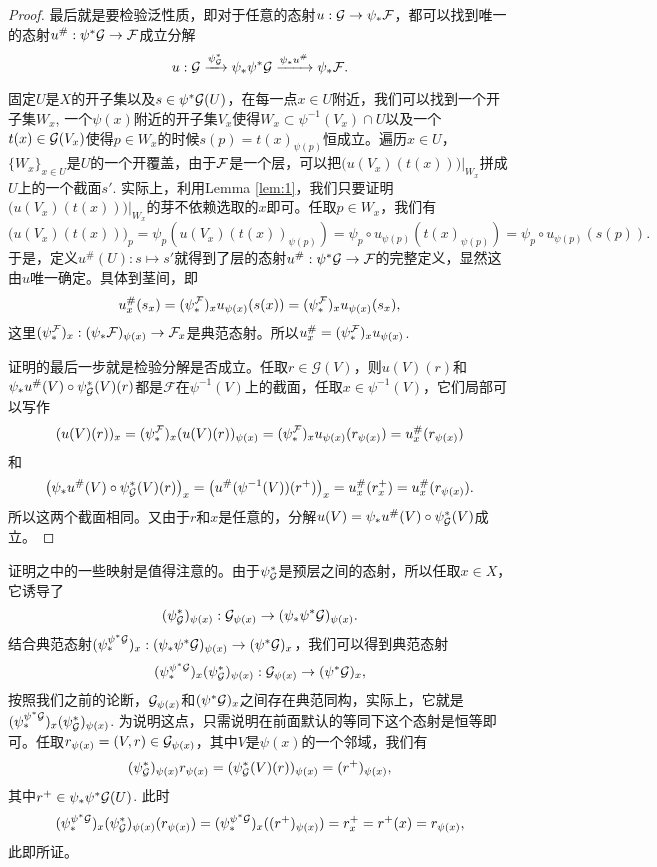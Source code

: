 \begin{proof}
	最后就是要检验泛性质，即对于任意的态射$u:\mathcal{G} \to \psi_*\mathcal{F}$，都可以找到唯一的态射$u^\#:\psi^*\mathcal{G} \to \mathcal{F}$成立分解
	\[
		u:\mathcal{G}\xrightarrow{\psi^*_{\mathcal{G}}} \psi_*\psi^*\mathcal{G} \xrightarrow{\psi_*u^\#} \psi_*\mathcal{F}.
	\]

	固定$U$是$X$的开子集以及$s\in \psi^*\mathcal{G}(U)$，在每一点$x\in U$附近，我们可以找到一个开子集$W_x$, 一个$\psi(x)$附近的开子集$V_x$使得$W_x\subset \psi^{-1}(V_x)\cap U$以及一个$t(x)\in \mathcal{G}(V_x)$使得$p\in W_x$的时候$s(p)=t(x)_{\psi(p)}$恒成立。遍历$x\in U$，$\{W_x\}_{x\in U}$是$U$的一个开覆盖，由于$\mathcal{F}$是一个层，可以把$\bigl(u(V_x)(t(x))\bigr)|_{W_x}$拼成$U$上的一个截面$s'$. 实际上，利用Lemma \ref{lem:1}，我们只要证明$\bigl(u(V_x)(t(x))\bigr)|_{W_x}$的芽不依赖选取的$x$即可。任取$p\in W_x$，我们有
	\[
	\bigl(u(V_x)(t(x))\bigr)_p=\psi_p\left(u(V_x)(t(x))_{\psi(p)}\right)=\psi_p\circ u_{\psi(p)}(t(x)_{\psi(p)})=\psi_p\circ u_{\psi(p)}(s(p)).
	\]
	于是，定义$u^\#(U):s\mapsto s'$就得到了层的态射$u^\#:\psi^*\mathcal{G} \to \mathcal{F}$的完整定义，显然这由$u$唯一确定。具体到茎间，即
	\[
	u^\#_x(s_x)=(\psi_*^{\mathcal{F}})_x u_{\psi(x)}(s(x))=(\psi_*^{\mathcal{F}})_x u_{\psi(x)}(s_x),
	\]
	这里$(\psi_*^{\mathcal{F}})_x:(\psi_*\mathcal{F})_{\psi(x)}\to \mathcal{F}_x$是典范态射。所以$u^\#_x=(\psi_*^{\mathcal{F}})_x u_{\psi(x)}$. 

	证明的最后一步就是检验分解是否成立。任取$r\in \mathcal{G}(V)$，则$u(V)(r)$和$\psi_*u^\#(V)\circ \psi^*_{\mathcal{G}}(V)(r)$都是$\mathcal{F}$在$\psi^{-1}(V)$上的截面，任取$x\in \psi^{-1}(V)$，它们局部可以写作
	\[
	(u(V)(r))_x=(\psi_*^{\mathcal{F}})_x (u(V)(r))_{\psi(x)}=(\psi_*^{\mathcal{F}})_x u_{\psi(x)}(r_{\psi(x)})=u^\#_x(r_{\psi(x)})
	\]
	和
	\[
	\left(\psi_*u^\#(V)\circ \psi^*_{\mathcal{G}}(V)(r)\right)_x=\bigl(u^\#(\psi^{-1}(V))(r^+)\bigr)_x=u^\#_x(r^+_x)=u^\#_x(r_{\psi(x)}).
	\]
	所以这两个截面相同。又由于$r$和$x$是任意的，分解$u(V)=\psi_*u^\#(V)\circ \psi^*_{\mathcal{G}}(V)$成立。
\end{proof}

证明之中的一些映射是值得注意的。由于$\psi^*_{\mathcal{G}}$是预层之间的态射，所以任取$x\in X$，它诱导了
\[
	(\psi^*_{\mathcal{G}})_{\psi(x)}:\mathcal{G}_{\psi(x)}\to (\psi_*\psi^*\mathcal{G})_{\psi(x)}.
\]
结合典范态射$(\psi_*^{\psi^*\mathcal{G}})_x:(\psi_*\psi^*\mathcal{G})_{\psi(x)}\to (\psi^*\mathcal{G})_{x}$，我们可以得到典范态射
\[
	(\psi_*^{\psi^*\mathcal{G}})_x(\psi^*_{\mathcal{G}})_{\psi(x)}:\mathcal{G}_{\psi(x)}\to (\psi^*\mathcal{G})_{x},
\]
按照我们之前的论断，$\mathcal{G}_{\psi(x)}$和$(\psi^*\mathcal{G})_{x}$之间存在典范同构，实际上，它就是$(\psi_*^{\psi^*\mathcal{G}})_x(\psi^*_{\mathcal{G}})_{\psi(x)}$. 为说明这点，只需说明在前面默认的等同下这个态射是恒等即可。任取$r_{\psi(x)}=(V,r)\in \mathcal{G}_{\psi(x)}$，其中$V$是$\psi(x)$的一个邻域，我们有
\[
	(\psi^*_{\mathcal{G}})_{\psi(x)}r_{\psi(x)}=(\psi^*_{\mathcal{G}}(V)(r))_{\psi(x)}=(r^+)_{\psi(x)},
\]
其中$r^+\in \psi_*\psi^*\mathcal{G}(U)$. 此时
\[
	(\psi_*^{\psi^*\mathcal{G}})_x(\psi^*_{\mathcal{G}})_{\psi(x)}(r_{\psi(x)})=(\psi_*^{\psi^*\mathcal{G}})_x((r^+)_{\psi(x)})=r^+_x=r^+(x)=r_{\psi(x)},
\]
此即所证。

